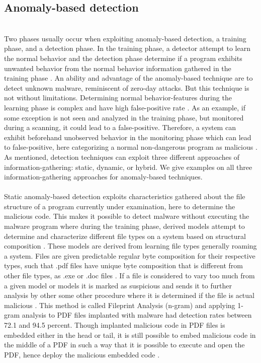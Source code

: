 \documentclass[12pt]{article} %
\begin{document}
\subsection{Anomaly-based detection}
\\
Two phases usually occur when exploiting anomaly-based detection, a training phase, and a detection phase. In the training phase, a detector attempt to learn the normal behavior and the detection phase determine if a program exhibits unwanted behavior from the normal behavior information gathered in the training phase \cite{idika2007survey}. An ability and advantage of the anomaly-based technique are to detect unknown malware, reminiscent of zero-day attacks. But this technique is not without limitations. Determining normal behavior-features during the learning phase is complex and have high false-positive rate \cite{idika2007survey}. As an example, if some exception is not seen and analyzed in the training phase, but monitored during a scanning, it could lead to a false-positive. Therefore, a system can exhibit beforehand unobserved behavior in the monitoring phase which can lead to false-positive, here categorizing a normal non-dangerous program as malicious \cite{idika2007survey}. \\
As mentioned, detection techniques can exploit three different approaches of information-gathering: static, dynamic, or hybrid. We give examples on all three information-gathering approaches for anomaly-based techniques. \\ \\
Static anomaly-based detection exploits characteristics gathered about the file structure of a program currently under examination, here to determine the malicious code. This makes it possible to detect malware without executing the malware program where during the training phase, derived models attempt to determine and characterize different file types on a system based on structural composition \cite{idika2007survey}. These models are derived from learning file types generally roaming a system. Files are given predictable regular byte composition for their respective types, such that .pdf files have unique byte composition that is different from other file types, as .exe or .doc files \cite{idika2007survey}. If a file is considered to vary too much from a given model or models it is marked as suspicious and sends it to further analysis by other some other procedure where it is determined if the file is actual malicious \cite{idika2007survey}. This method is called Fileprint Analysis (n-gram) and applying 1-gram analysis to PDF files implanted with malware had detection rates between 72.1 and 94.5 percent. Though implanted malicious code in PDF files is embedded either in the head or tail, it is still possible to embed malicious code in the middle of a PDF in such a way that it is possible to execute and open the PDF, hence deploy the malicious embedded code \cite{idika2007survey}. \\
\end{document}
